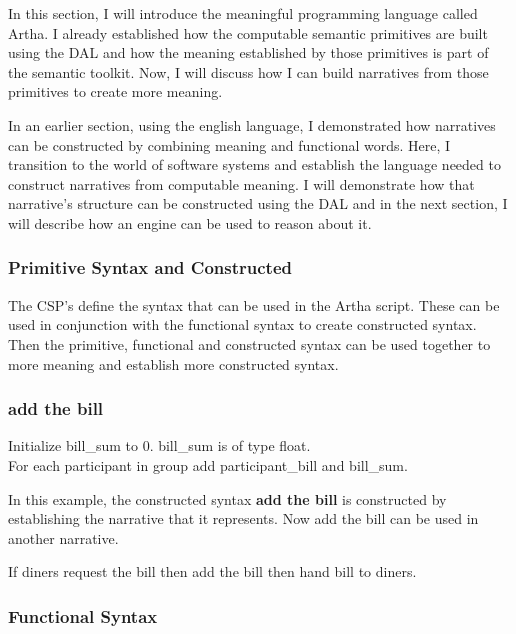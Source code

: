 In this section, I will introduce the meaningful programming language called Artha. I already established how the computable semantic primitives are built using the DAL and how the meaning established by those primitives is part of the semantic toolkit. Now, I will discuss how I can build narratives from those primitives to create more meaning. 

In an earlier section, using the english language, I demonstrated how narratives can be constructed by combining meaning and functional words. Here, I transition to the world of software systems and establish the language needed to construct narratives from computable meaning. I will demonstrate how that narrative's structure can be constructed using the DAL and in the next section, I will describe how an engine can be used to reason about it.

\subsubsection{Primitive Syntax and Constructed}

The CSP's define the syntax that can be used in the Artha script. These can be used in conjunction with the functional syntax to create constructed syntax. Then the primitive, functional and constructed syntax can be used together to more meaning and establish more constructed syntax.

\subsubsection*{add the bill}
\begin{greyquote}
    Initialize bill\_sum to 0. bill\_sum is of type float.\\

    For each participant in group add participant\_bill and bill\_sum.
\end{greyquote}

In this example, the constructed syntax \textbf{add the bill} is constructed by establishing the narrative that it represents. Now add the bill can be used in another narrative.

\begin{greyquote}
    If diners request the bill then add the bill then hand bill to diners.
\end{greyquote}

\subsubsection{Functional Syntax}

